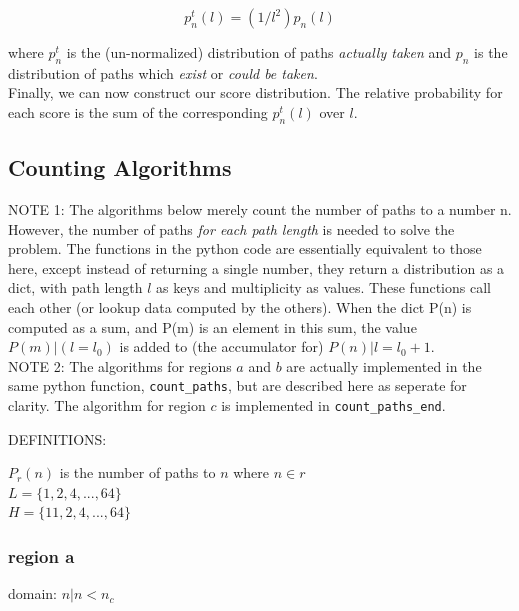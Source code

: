 \documentclass[a4paper, 11pt]{article}
\begin{document}
\[ p_n^t(l) = (1 / l^2)p_n(l) \]

where $p_n^t$ is the (un-normalized) distribution of paths \textit{actually taken} and $p_n$ is the distribution of paths which \textit{exist} or \textit{could be taken}.\\

Finally, we can now construct our score distribution. The relative probability for each score is the sum of the corresponding $p_n^t(l)$ over $l$.

\subsection{Counting Algorithms}


NOTE 1: The algorithms below merely count the number of paths to a number n. However, the number of paths \textit{for each path length} is needed to solve the problem. The functions in the python code are essentially equivalent to those here, except instead of returning a single number, they return a distribution as a dict, with path length $l$ as keys and multiplicity as values. These functions call each other (or lookup data computed by the others). When the dict P(n) is computed as a sum, and P(m) is an element in this sum, the value $P(m)|(l=l_0)$ is added to (the accumulator for) $P(n)|l = l_0 + 1$.\\ 


NOTE 2: The algorithms for regions $a$ and $b$ are actually implemented in the same python function, \texttt{count\_paths}, but are described here as seperate for clarity. The algorithm for region $c$ is implemented in \texttt{count\_paths\_end}.\\


\pagebreak

DEFINITIONS:

\begin{adjustwidth}{3.0em}{3.0em}
$P_r(n)$ is the number of paths to $n$ where $n \in r$\\

$L = \{1, 2, 4, . . . , 64\}$ \\

$H = \{11, 2, 4, . . . , 64\}$ \\

\end{adjustwidth}

\subsubsection{region a}
domain: $n \vert n < n_c$
\end{document}
